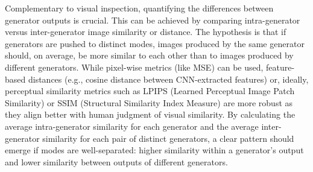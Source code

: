 Complementary to visual inspection, quantifying the differences between generator outputs is crucial. This can be achieved by comparing intra-generator versus inter-generator image similarity or distance. The hypothesis is that if generators are pushed to distinct modes, images produced by the same generator should, on average, be more similar to each other than to images produced by different generators. While pixel-wise metrics (like MSE) can be used, feature-based distances (e.g., cosine distance between CNN-extracted features) or, ideally, perceptual similarity metrics such as LPIPS (Learned Perceptual Image Patch Similarity) or SSIM (Structural Similarity Index Measure) are more robust as they align better with human judgment of visual similarity. By calculating the average intra-generator similarity for each generator and the average inter-generator similarity for each pair of distinct generators, a clear pattern should emerge if modes are well-separated: higher similarity within a generator's output and lower similarity between outputs of different generators.

\newpage
